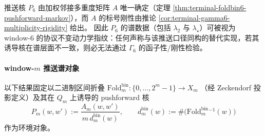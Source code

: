 

\begin{remark}\label{rem:terminal-p6-protocol-invariant-spectral-fingerprint}
推送核 \(P_6\) 由加权邻接多重度矩阵 \(A\) 唯一确定（定理 \ref{thm:terminal-foldbin6-pushforward-markov}），而 \(A\) 的标号刚性由推论 \ref{cor:terminal-gamma6-multiplicity-rigidity} 给出。
因此 \(P_6\) 的谱数据（包括 \(\lambda_2\) 与 \(\lambda_\star\)）可被视为 window-\(6\) 的协议不变动力学指纹：任何声称与该推送口径同构的替代实现，若其诱导核在谱层面不一致，则必无法通过 \(\Gamma_6\) 的函子性/刚性检验。
\end{remark}

\paragraph{window-\texorpdfstring{$m$}{m} 推送谱对象}
以下结果固定以二进制区间折叠
\(
\mathrm{Fold}^{\mathrm{bin}}_m:\{0,\dots,2^m-1\}\to X_m
\)
（经 Zeckendorf 投影定义）及其在 \(Q_m\) 上诱导的 pushforward 核
\[
P_m(w,w'):=\frac{A_m(w,w')}{m\,d^{\mathrm{bin}}_m(w)},
\qquad
d^{\mathrm{bin}}_m(w):=\#\bigl(\mathrm{Fold}^{\mathrm{bin}}_m{}^{-1}(w)\bigr)
\]
作为环境对象。

